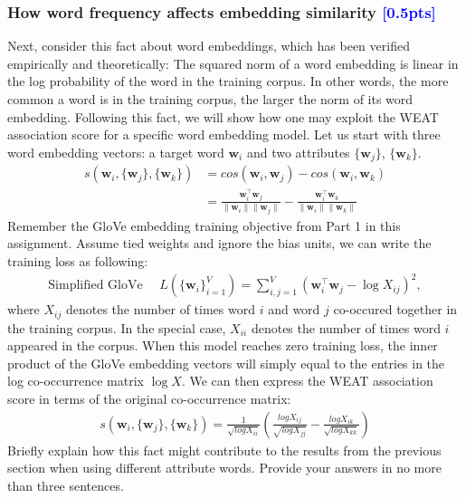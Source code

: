 \subsubsection{How word frequency affects embedding similarity \textcolor{blue}{[0.5pts]} \LIII\EC}

Next, consider this fact about word embeddings, which has been verified empirically and theoretically: The squared norm of a word embedding is linear in the log probability of the word in the training corpus. In other words, the more common a word is in the training corpus, the larger the norm of its word embedding. Following this fact, we will show how one may exploit the WEAT association score for a specific word embedding model. Let us start with three word embedding vectors: a target word $\mathbf{w}_i$ and two attributes $\{\mathbf{w}_j\}$, $\{\mathbf{w}_k\}$. 
\begin{align*}
    s(\mathbf{w}_i, \{\mathbf{w}_j\}, \{\mathbf{w}_k\}) &= cos(\mathbf{w}_i, \mathbf{w}_j) - cos(\mathbf{w}_i, \mathbf{w}_k) \\
    &= \frac{\mathbf{w}_i^\top\mathbf{w}_j}{\|\mathbf{w}_i\|\|\mathbf{w}_j\|} - \frac{\mathbf{w}_i^\top\mathbf{w}_k}{\|\mathbf{w}_i\|\|\mathbf{w}_k\|}
\end{align*}
Remember the GloVe embedding training objective from Part 1 in this assignment. Assume tied weights and ignore the bias units, we can write the training loss as following:
\begin{gather*}
    \text{Simplified GloVe }\quad L(\{\mathbf{w}_i\}_{i=1}^V) = \sum_{i,j=1}^V (\mathbf{w}_i^\top{\mathbf{w}}_j - \log X_{ij})^2, 
\end{gather*}
where $X_{ij}$ denotes the number of times word $i$ and word $j$ co-occured together in the training corpus. In the special case, $X_{ii}$ denotes the number of times word $i$ appeared in the corpus. When this model reaches zero training loss, the inner product of the GloVe embedding vectors will simply equal to the entries in the log co-occurrence matrix $\log X$. We can then express the WEAT association score in terms of the original co-occurrence matrix:
\begin{gather*}
    s(\mathbf{w}_i, \{\mathbf{w}_j\}, \{\mathbf{w}_k\})= \frac{1}{\sqrt{logX_{ii}}}\left(\frac{{logX_{ij}}}{\sqrt{logX_{jj}}} - \frac{{logX_{ik}}}{\sqrt{logX_{kk}}}\right)
\end{gather*}
Briefly explain how this fact might contribute to the results from the previous section when using different attribute words. Provide your answers in no more than three sentences.

